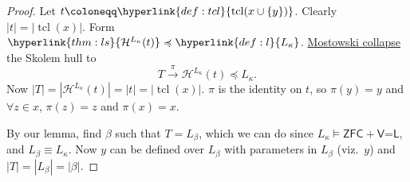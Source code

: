 \documentclass{article}
\newcommand{\1}{\mathbbm{1}}
\DeclareMathOperator{\tcl}{tcl}
\let\models\vDash
\begin{document}
\begin{proof}
  Let $t \coloneqq \hyperlink{def:tcl}{\tcl(x \cup \{y\})}$.
  Clearly $|t| = |\tcl(x)|$. Form $\hyperlink{thm:ls}{\mathcal{H}^{L_\kappa}(t)} \preccurlyeq \hyperlink{def:l}{L_\kappa}$.
  \hyperlink{thm:mct}{Mostowski collapse} the Skolem hull to
  \begin{equation*}
    T \xrightarrow{\pi} \mathcal{H}^{L_\kappa}(t) \preccurlyeq L_\kappa.
  \end{equation*}
  Now $|T| = |\mathcal{H}^{L_\kappa}(t)| = |t| = |\tcl(x)|$.
  $\pi$ is the identity on $t$, so $\pi(y) = y$ and $\forall z \in x$, $\pi(z) = z$ and $\pi(x) = x$.

  By our lemma, find $\beta$ such that $T = L_\beta$, which we can do since $L_\kappa \models \textsf{ZFC}+\textsf{V=L}$, and $L_\beta \equiv L_\kappa$.
  Now $y$ can be defined over $L_\beta$ with parameters in $L_\beta$ (viz.\ $y$) and $|T| = |L_\beta| = |\beta|$.
\end{proof}
\end{document}
